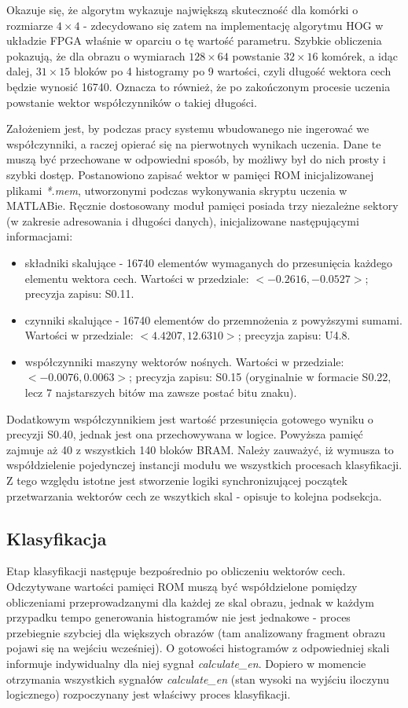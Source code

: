 \newline
Okazuje się, że algorytm wykazuje największą skuteczność dla komórki o rozmiarze $4\times 4$ - zdecydowano się zatem na implementację algorytmu HOG w układzie FPGA właśnie w oparciu o tę wartość parametru. Szybkie obliczenia pokazują, że dla obrazu o wymiarach $128\times 64$ powstanie $32\times 16$ komórek, a idąc dalej, $31\times 15$ bloków po 4 histogramy po 9 wartości, czyli długość wektora cech będzie wynosić 16740. Oznacza to również, że po zakończonym procesie uczenia powstanie wektor współczynników o takiej długości.

Założeniem jest, by podczas pracy systemu wbudowanego nie ingerować we współczynniki, a raczej opierać się na pierwotnych wynikach uczenia. Dane te muszą być przechowane w odpowiedni sposób, by możliwy był do nich prosty i szybki dostęp. Postanowiono zapisać wektor w pamięci ROM inicjalizowanej plikami \textit{*.mem}, utworzonymi podczas wykonywania skryptu uczenia w MATLABie. Ręcznie dostosowany moduł pamięci posiada trzy niezależne sektory (w zakresie adresowania i długości danych), inicjalizowane następującymi informacjami: 

\begin{itemize}
	\item składniki skalujące - 16740 elementów wymaganych do przesunięcia każdego elementu wektora cech. Wartości w przedziale: $<-0.2616, -0.0527>$; precyzja zapisu: S0.11.
	\item czynniki skalujące - 16740 elementów do przemnożenia z powyższymi sumami. Wartości w przedziale: $<4.4207, 12.6310>$; precyzja zapisu: U4.8.
	\item współczynniki maszyny wektorów nośnych. Wartości w przedziale: $<   -0.0076, 0.0063>$; precyzja zapisu: S0.15 (oryginalnie w formacie S0.22, lecz 7 najstarszych bitów ma zawsze postać bitu znaku).
\end{itemize}

Dodatkowym współczynnikiem jest wartość przesunięcia gotowego wyniku o precyzji S0.40, jednak jest ona przechowywana w logice. 
Powyższa pamięć zajmuje aż 40 z wszystkich 140 bloków BRAM. Należy zauważyć, iż wymusza to współdzielenie pojedynczej instancji modułu we wszystkich procesach klasyfikacji. Z tego względu istotne jest stworzenie logiki synchronizującej początek przetwarzania wektorów cech ze wszytkich skal - opisuje to kolejna podsekcja.

\subsection{Klasyfikacja}
Etap klasyfikacji następuje bezpośrednio po obliczeniu wektorów cech. Odczytywane wartości pamięci ROM muszą być współdzielone pomiędzy obliczeniami przeprowadzanymi dla każdej ze skal obrazu, jednak w każdym przypadku tempo generowania histogramów nie jest jednakowe - proces przebiegnie szybciej dla większych obrazów (tam analizowany fragment obrazu pojawi się na wejściu wcześniej). O gotowości histogramów z odpowiedniej skali informuje indywidualny dla niej sygnał \textit{calculate\_en}. Dopiero w momencie otrzymania wszystkich sygnałów \textit{calculate\_en} (stan wysoki na wyjściu iloczynu logicznego) rozpoczynany jest właściwy proces klasyfikacji.

